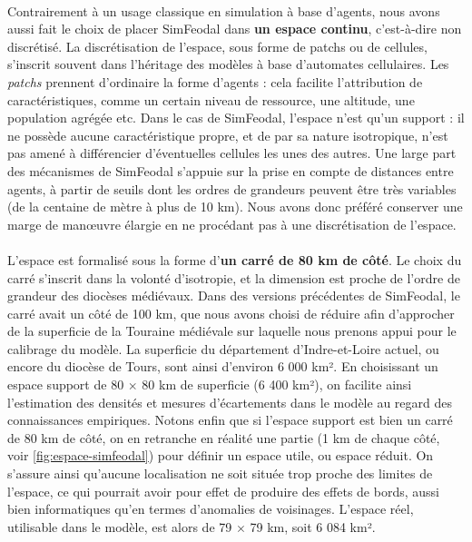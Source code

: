 \paragraph[Continu]{}Contrairement à un usage classique en simulation à base d'agents, nous avons aussi fait le choix de placer SimFeodal dans \textbf{un espace continu}, c'est-à-dire non discrétisé.
La discrétisation de l'espace, sous forme de \og patchs\fg{} ou de \og cellules\fg{}, s'inscrit souvent dans l'héritage des modèles à base d'automates cellulaires.
Les \textit{patchs} prennent d'ordinaire la forme d'agents : cela facilite l'attribution de caractéristiques, comme un certain niveau de ressource, une altitude, une population agrégée etc.
Dans le cas de SimFeodal, l'espace n'est qu'un support : il ne possède aucune caractéristique propre, et de par sa nature isotropique, n'est pas amené à différencier d'éventuelles cellules les unes des autres.
Une large part des mécanismes de SimFeodal s'appuie sur la prise en compte de distances entre agents, à partir de seuils dont les ordres de grandeurs peuvent être très variables (de la centaine de mètre à plus de 10 km).
Nous avons donc préféré conserver une marge de manœuvre élargie en ne procédant pas à une discrétisation de l'espace.

\paragraph[Dimension]{}L'espace est formalisé sous la forme d'\textbf{un carré de 80 km de côté}.
Le choix du carré s'inscrit dans la volonté d'isotropie, et la dimension est proche de l'ordre de grandeur des diocèses médiévaux.
Dans des versions précédentes de SimFeodal, le carré avait un côté de 100 km, que nous avons choisi de réduire afin d'approcher de la superficie de la Touraine médiévale sur laquelle nous prenons appui pour le calibrage du modèle. 
La superficie du département d'Indre-et-Loire actuel, ou encore du diocèse de Tours, sont ainsi d'environ 6 000 km².
En choisissant un espace support de 80 $\times$ 80 km de superficie (6 400 km²), on facilite ainsi l'estimation des densités et mesures d'écartements dans le modèle au regard des connaissances empiriques.
Notons enfin que si l'espace support est bien un carré de 80 km de côté, on en retranche en réalité une partie (1 km de chaque côté, voir \cref{fig:espace-simfeodal}) pour définir un espace utile, ou \og espace réduit\fg{}.
On s'assure ainsi qu'aucune localisation ne soit située trop proche des limites de l'espace, ce qui pourrait avoir pour effet de produire des \og effets de bords\fg{}, aussi bien informatiques qu'en termes d'anomalies de voisinages.
L'espace réel, utilisable dans le modèle, est alors de 79 $\times$ 79 km, soit 6 084 km².

